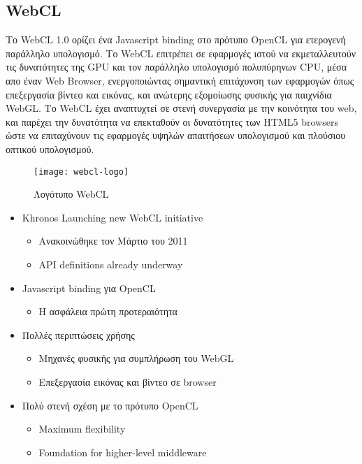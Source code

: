 \subsection{WebCL}
Το WebCL 1.0 ορίζει ένα Javascript binding στο πρότυπο OpenCL για ετερογενή παράλληλο υπολογισμό. Το WebCL επιτρέπει σε εφαρμογές ιστού να εκμεταλλευτούν τις δυνατότητες της GPU και τον παράλληλο υπολογισμό πολυπύρηνων CPU, μέσα απο έναν Web Browser, ενεργοποιώντας σημαντική επιτάχυνση των εφαρμογών όπως επεξεργασία βίντεο και εικόνας, και ανώτερης εξομοίωσης φυσικής για παιχνίδια WebGL. Το WebCL έχει αναπτυχτεί σε στενή συνεργασία με την κοινότητα του web, και παρέχει την δυνατότητα να επεκταθούν οι δυνατότητες των HTML5 browsers ώστε να επιταχύνουν τις εφαρμογές υψηλών απαιτήσεων υπολογισμού και πλούσιου οπτικού υπολογισμού.
\begin{figure}[h]
	\texttt{[image: webcl-logo]}
	\centering
	\caption{Λογότυπο WebCL}
\end{figure}
\begin{itemize}
\item Khronos Launching new WebCL initiative
	\begin{itemize}
	\item Ανακοινώθηκε τον Μάρτιο του 2011
	\item API definitions already underway
	\end{itemize}
\item Javascript binding για OpenCL
	\begin{itemize}
	\item Η ασφάλεια πρώτη προτεραιότητα
	\end{itemize}
\item Πολλές περιπτώσεις χρήσης
	\begin{itemize}
	\item Μηχανές φυσικής για συμπλήρωση του WebGL
	\item Επεξεργασία εικόνας και βίντεο σε browser
	\end{itemize}
\item Πολύ στενή σχέση με το πρότυπο OpenCL
	\begin{itemize}
	\item Maximum flexibility
	\item Foundation for higher-level middleware
	\end{itemize}
\end{itemize}

